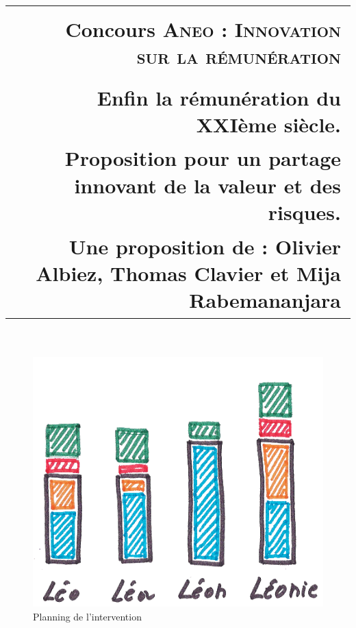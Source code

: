\documentclass[12pt]{article}
\title{
  \begin{tabular}{p{2 cm} r}
    \hline\hline
    & \\
    & Concours \textsc{Aneo} : \textsc{Innovation sur la rémunération} \\
    & \\
    & \small{Enfin la rémunération du XXIème siècle.}\\
    & \small{Proposition pour un partage innovant de la valeur et des risques.} \\
    & \small{Une proposition de : Olivier Albiez, Thomas Clavier et Mija Rabemananjara} \\
    \hline\hline
  \end{tabular}
}
\date{}
\begin{document}
\pagestyle{plain}
\maketitle
\newpage

\tableofcontents
\newpage

\begin{figure}
  \begin{center}
    \includegraphics[width=\textwidth]{includes/remuneration}
  \end{center}
  \caption{Planning de l'intervention}
  \label{planning}
\end{figure}


\end{document}
